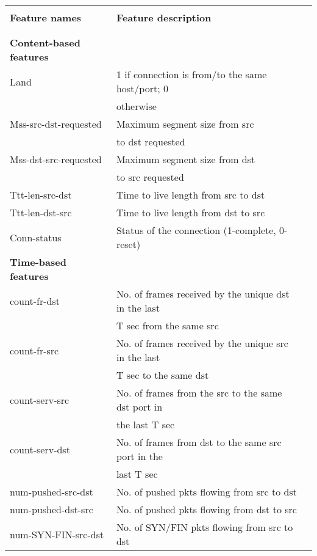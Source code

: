 \centering
{\footnotesize
	 \label{tab:tuids2} 
	\begin{tabular}{llr}
	\hline
		&  \\
		\textbf{Feature names}    & \textbf{Feature description} \\
		&  \\
		\hline
				&  \\
				\textbf{Content-based features} & \\
				Land & 1 if connection is from/to the same host/port; 0 \\
				&otherwise\\
				Mss-src-dst-requested & Maximum segment size from src\\
				& to dst requested\\
				Mss-dst-src-requested & Maximum segment size from dst \\
				&to src requested\\
				Ttt-len-src-dst & Time to live length from src to dst\\
				Ttt-len-dst-src & Time to live length from dst to src\\
				Conn-status & Status of the connection (1-complete, 0-reset)\\
		\textbf{Time-based features} & \\
		count-fr-dst & No. of frames received by the unique dst in the last \\
		&T sec from the same src\\
		count-fr-src & No. of frames received by the unique src in the last \\
		&T sec to the same dst\\
		count-serv-src & No. of frames from the src to the same dst port in \\
		&the last T sec\\
		count-serv-dst & No. of frames from dst to the same src port in the \\
		&last T sec\\
		num-pushed-src-dst & No. of pushed pkts flowing from src to dst\\
		num-pushed-dst-src & No. of pushed pkts flowing from dst to src\\
		num-SYN-FIN-src-dst & No. of SYN/FIN pkts flowing from src to dst\\

\end{tabular}}
